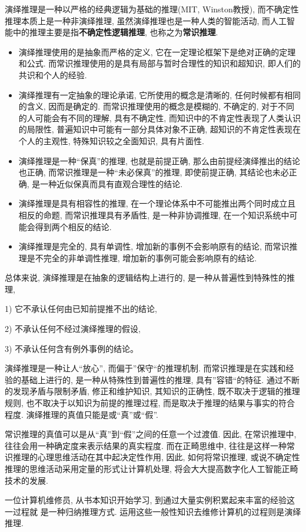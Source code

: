 演绎推理是一种以严格的经典逻辑为基础的推理(MIT, Winston教授), 而不确定性推理本质上是一种非演绎推理, 虽然演绎推理也是一种人类的智能活动, 而人工智能中的推理主要是指\textbf{不确定性逻辑推理}, 也称之为\textbf{常识推理}.
\begin{itemize}
\item 演绎推理使用的是抽象而严格的定义, 它在一定理论框架下是绝对正确的定理和公式. 而常识推理使用的是具有局部与暂时合理性的知识和超知识, 即人们的共识和个人的经验.
\item 演绎推理有一定抽象的理论承诺, 它所使用的概念是清晰的, 任何时候都有相同的含义, 因而是确定的. 而常识推理使用的概念是模糊的, 不确定的, 对于不同的人可能会有不同的理解, 具有不确定性, 而知识中的不肯定性表现了人类认识的局限性, 普遍知识中可能有一部分具体对象不正确, 超知识的不肯定性表现在个人的主观性, 特殊知识较之全面知识, 具有片面性.
\item 演绎推理是一种“保真”的推理, 也就是前提正确, 那么由前提经演绎推出的结论也正确, 而常识推理是一种“未必保真”的推理, 即使前提正确, 其结论也未必正确, 是一种近似保真而具有直观合理性的结论.
\item 演绎推理是具有相容性的推理, 在一个理论体系中不可能推出两个同时成立且相反的命题, 而常识推理具有矛盾性, 是一种非协调推理, 在一个知识系统中可能会得到两个相反的结论.
\item 演绎推理是完全的, 具有单调性, 增加新的事例不会影响原有的结论, 而常识推理是不完全的非单调性推理, 增加新的事例可能会影响原有的结论.
\end{itemize}

总体来说, 演绎推理是在抽象的逻辑结构上进行的, 是一种从普遍性到特殊性的推理,

1) 它不承认任何由已知前提推不出的结论,

2) 不承认任何不经过演绎推理的假设,

3) 不承认任何含有例外事例的结论。

演绎推理是一种让人“放心”, 而偏于”保守“的推理机制. 而常识推理是在实践和经验的基础上进行的, 是一种从特殊性到普遍性的推理, 具有”容错“的特征.
通过不断的发现矛盾与限制矛盾, 修正和维护知识, 其知识的正确性, 既不取决于逻辑的推理规则, 也不取决于以知识为前提的推理过程, 而是取决于推理的结果与事实的符合程度.
演绎推理的真值只能是或“真”或“假”.

常识推理的真值可以是从“真”到“假”之间的任意一个过渡值. 因此, 在常识推理中, 往往会用一种确定度来表示结果的真实程度.
而在正畸思维中, 往往是这样一种常识推理的心理思维活动在其中起决定性作用, 因此, 如何将常识推理, 或说不确定性推理的思维活动采用定量的形式让计算机处理, 将会大大提高数字化人工智能正畸技术的发展.
\begin{example}
  一位计算机维修员, 从书本知识开始学习, 到通过大量实例积累起来丰富的经验这一过程就 是一种归纳推理方式. 运用这些一般性知识去维修计算机的过程则是演绎推理.
\end{example}
